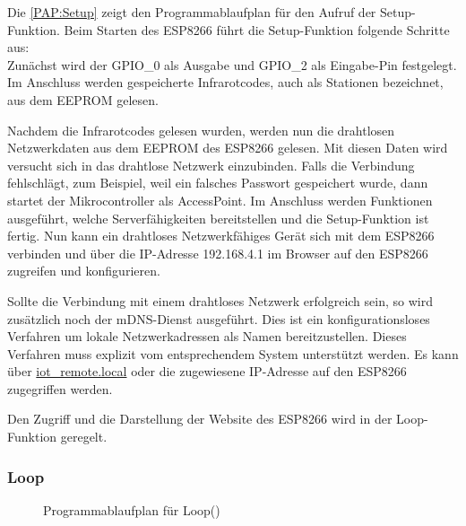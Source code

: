Die \autoref{PAP:Setup} zeigt den Programmablaufplan für den Aufruf der Setup-Funktion.
Beim Starten des ESP8266 führt die Setup-Funktion folgende Schritte aus:\\
Zunächst wird der \acs{GPIO}\_0 als Ausgabe und \acs{GPIO}\_2 als Eingabe-Pin festgelegt.
Im Anschluss werden gespeicherte Infrarotcodes, auch als Stationen bezeichnet, aus dem \acs{EEPROM} gelesen.

Nachdem die Infrarotcodes gelesen wurden, werden nun die drahtlosen Netzwerkdaten aus dem \acs{EEPROM} des ESP8266 gelesen.
Mit diesen Daten wird versucht sich in das drahtlose Netzwerk einzubinden.
Falls die Verbindung fehlschlägt, zum Beispiel, weil ein falsches Passwort gespeichert wurde, dann startet der Mikrocontroller als AccessPoint.
Im Anschluss werden Funktionen ausgeführt, welche Serverfähigkeiten bereitstellen und die Setup-Funktion ist fertig.
Nun kann ein drahtloses Netzwerkfähiges Gerät sich mit dem ESP8266 verbinden und über die IP-Adresse 192.168.4.1 im Browser auf den ESP8266 zugreifen und konfigurieren.

Sollte die Verbindung mit einem drahtloses Netzwerk erfolgreich sein, so wird zusätzlich noch der mDNS-Dienst ausgeführt.
Dies ist ein konfigurationsloses Verfahren um lokale Netzwerkadressen als Namen bereitzustellen.
Dieses Verfahren muss explizit vom entsprechendem System unterstützt werden.
Es kann über \url{iot_remote.local} oder die zugewiesene IP-Adresse auf den ESP8266 zugegriffen werden.

Den Zugriff und die Darstellung der Website des ESP8266 wird in der Loop-Funktion geregelt.
\subsubsection{Loop}
\begin{figure}[!ht]
\centering 
{}
\caption{Programmablaufplan für Loop()}
\label{PAP:Loop}
\end{figure}

